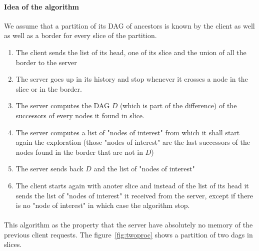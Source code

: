 \paragraph{Idea of the algorithm} We assume that a partition of its DAG of ancestors is known by the client as well as well as a border for every slice of the partition.
\begin{enumerate}
 \item The client sends the list of its head, one of its slice and the union of all the border to the server
 \item The server goes up in its history and stop whenever it crosses a node in the slice or in the border.

 \item The server computes the DAG $D$ (which is part of the difference) of the successors of every nodes it found in slice.
 \item The server computes a list of "nodes of interest" from which it shall start again the exploration (those "nodes of interest" are the last successors of the nodes found in the border that are not in $D$)
 \item The server sends back $D$ and the list of "nodes of interest"
 \item The client starts again with anoter slice and instead of the list of its head it sends the list of "nodes of interest" it received from the server, except if there is no "node of interest" in which case the algorithm stop.
\end{enumerate}
\paragraph{} This algorithm as the property that the server have absolutely no memory of the previous client requests. The figure~\ref{fig:twoproc} shows a partition of two dags in slices.

